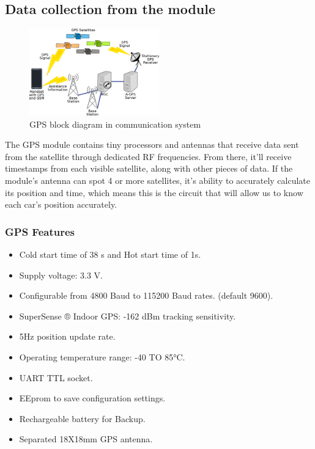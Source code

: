\subsection{Data collection from the module}
\begin{figure}
    \includegraphics[width=0.5\textwidth]{figure/5_7.png}
    \caption{GPS block diagram in communication system}
    \label{fig:gps-block}
\end{figure}
The GPS module contains tiny processors and antennas that receive data sent from
the satellite through dedicated RF frequencies. From there, it’ll receive timestamps
from each visible satellite, along with other pieces of data. If the module’s antenna
can spot 4 or more satellites, it’s ability to accurately calculate its position and time,
which means this is the circuit that will allow us to know each car’s position
accurately.

\subsubsection{GPS Features}
\begin{itemize}
    \item Cold start time of 38 s and Hot start time of 1s.
    \item Supply voltage: 3.3 V.
    \item Configurable from 4800 Baud to 115200 Baud rates. (default 9600).
    \item SuperSense ® Indoor GPS: -162 dBm tracking sensitivity.
    \item 5Hz position update rate.
    \item Operating temperature range: -40 TO 85°C.
    \item UART TTL socket.
    \item EEprom to save configuration settings.
    \item Rechargeable battery for Backup.
    \item Separated 18X18mm GPS antenna.

\end{itemize}


